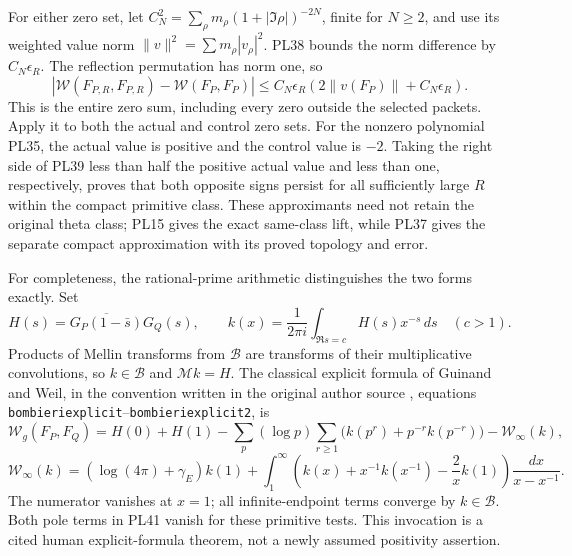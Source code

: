 \documentclass[11pt,a4paper]{article}
\theoremstyle{definition}\newtheorem{definition}[theorem]{Definition}
\begin{document}
For either zero set, let \(C_N^2=\sum_\rho
m_\rho(1+|\Im\rho|)^{-2N}\), finite for \(N\ge2\), and use its
weighted value norm \(\|v\|^2=\sum m_\rho|v_\rho|^2\).
PL38 bounds the norm difference by \(C_N\epsilon_R\).
The reflection permutation has norm one, so
\[
 |\mathcal W(F_{P,R},F_{P,R})-\mathcal W(F_P,F_P)|
 \le C_N\epsilon_R(2\|v(F_P)\|+C_N\epsilon_R).
 \tag{PL39}\label{pl:pl:error}
\]
This is the entire zero sum, including every zero outside the
selected packets. Apply it to both the actual and control zero sets.
For the nonzero polynomial PL35, the actual value is positive
and the control value is \(-2\). Taking the right side of PL39
less than half the positive actual value and less than one,
respectively, proves that both opposite signs persist for all
sufficiently large \(R\) within the compact primitive class.
These approximants need not retain the original theta class;
PL15 gives the exact same-class lift, while PL37 gives the
separate compact approximation with its proved topology and error.

For completeness, the rational-prime arithmetic distinguishes the
two forms exactly. Set
\[
 H(s)=\overline{G_P(1-\bar s)}G_Q(s),\qquad
 k(x)=\frac1{2\pi i}\int_{\Re s=c}H(s)x^{-s}\,ds\quad(c>1).
 \tag{PL40}\label{pl:pl:correlation}
\]
Products of Mellin transforms from \(\mathscr B\) are transforms of their
multiplicative convolutions, so \(k\in\mathscr B\) and \(\mathcal M k=H\).
The classical explicit formula of Guinand and Weil, in the
convention written in the original author source \cite{PLConnes},
equations \texttt{bombieriexplicit}--\texttt{bombieriexplicit2}, is
\[
 \mathcal W_g(F_P,F_Q)
 =H(0)+H(1)
 -\sum_p(\log p)\sum_{r\ge1}\bigl(k(p^r)+p^{-r}k(p^{-r})\bigr)
 -\mathcal W_\infty(k),
 \tag{PL41}\label{pl:pl:explicit}
\]
\[
 \mathcal W_\infty(k)=(\log(4\pi)+\gamma_E)k(1)
 +\int_1^\infty
 \left(k(x)+x^{-1}k(x^{-1})-\frac2x k(1)\right)
                    \frac{dx}{x-x^{-1}}.
 \tag{PL42}
\]
The numerator vanishes at \(x=1\); all infinite-endpoint terms
converge by \(k\in\mathscr B\). Both pole terms in PL41 vanish for these
primitive tests. This invocation is a cited human explicit-formula
theorem, not a newly assumed positivity assertion.
\end{document}
